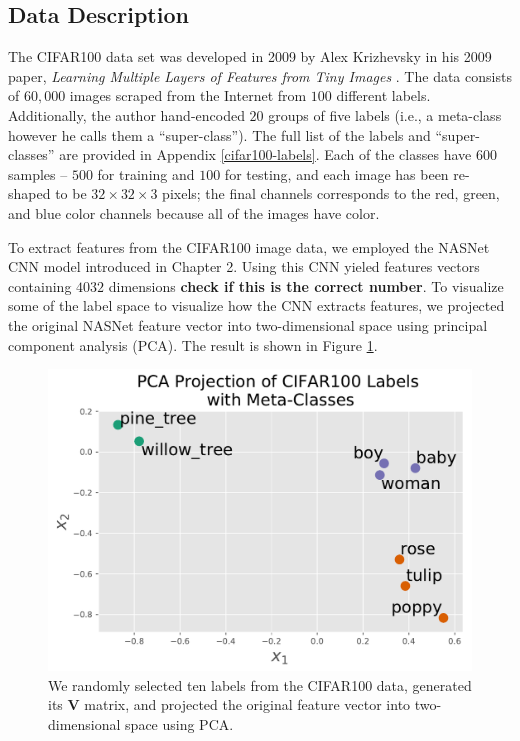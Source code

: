 \documentclass[../thesis.tex]{subfiles}
\begin{document}
\subsection{Data Description}
The CIFAR100 data set was developed in 2009 by Alex Krizhevsky in his 2009 paper, \textit{Learning Multiple Layers of Features from Tiny Images} \cite{krizhevsky2009learning}. The data consists of $60,000$ images scraped from the Internet from $100$ different labels. Additionally, the author hand-encoded $20$ groups of five labels (i.e., a meta-class however he calls them a ``super-class''). The full list of the labels and ``super-classes'' are provided in Appendix \ref{cifar100-labels}. Each of the classes have $600$ samples -- $500$ for training and $100$ for testing, and each image has been re-shaped to be $32 \times 32 \times 3$ pixels; the final channels corresponds to the red, green, and blue color channels because all of the images have color.

To extract features from the CIFAR100 image data, we employed the NASNet CNN model introduced in Chapter 2. Using this CNN yieled features vectors containing $4032$ dimensions \textbf{check if this is the correct number}. To visualize some of the label space to visualize how the CNN extracts features, we projected the original NASNet feature vector into two-dimensional space using principal component analysis (PCA). The result is shown in Figure \ref{fig:cifar-pca}.

\begin{figure}
    \centering
    \includegraphics[width=\linewidth]{images/cifar-pca.pdf}
    \caption[CIFAR100 PCA Projection]{We randomly selected ten labels from the CIFAR100 data, generated its $\mathbf{V}$ matrix, and projected the original feature vector into two-dimensional space using PCA.}
    \label{fig:cifar-pca}
\end{figure}
\end{document}
